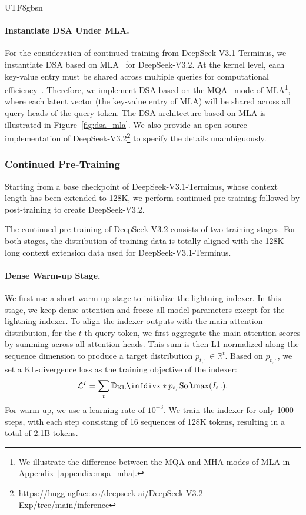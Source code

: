 \documentclass[11pt, a4paper, logo, copyright, nonumbering]{deepseek}
\def\newmodel{DeepSeek-V3.2}
\def\oldmodel{DeepSeek-V3.1-Terminus}
\def\method{DSA}
\newcommand{\Dkl}{\mathbb{D}_{\mathrm{KL}}\infdivx*}
\begin{document}
\begin{CJK*}{UTF8}{gbsn}
\paragraph{Instantiate \method{} Under MLA.}
For the consideration of continued training from \oldmodel{}, we instantiate DSA based on MLA~\citep{deepseekV2} for \newmodel{}.
At the kernel level, each key-value entry must be shared across multiple queries for computational efficiency~\citep{yuan-etal-2025-native}. 
Therefore, we implement DSA based on the MQA~\citep{MQA} mode of MLA\footnote{We illustrate the difference between the MQA and MHA modes of MLA in Appendix~\ref{appendix:mqa_mha}.}, where each latent vector (the key-value entry of MLA) will be shared across all query heads of the query token. 
The DSA architecture based on MLA is illustrated in Figure~\ref{fig:dsa_mla}.
We also provide an open-source implementation of \newmodel{}\footnote{\url{https://huggingface.co/deepseek-ai/DeepSeek-V3.2-Exp/tree/main/inference}} to specify the details unambiguously.

\subsubsection{Continued Pre-Training}

Starting from a base checkpoint of \oldmodel{}, whose context length has been extended to 128K, we perform continued pre-training followed by post-training to create \newmodel{}.

The continued pre-training of \newmodel{} consists of two training stages. 
For both stages, the distribution of training data is totally aligned with the 128K long context extension data used for \oldmodel{}. 

\paragraph{Dense Warm-up Stage.}
We first use a short warm-up stage to initialize the lightning indexer. 
In this stage, we keep dense attention and freeze all model parameters except for the lightning indexer. 
To align the indexer outputs with the main attention distribution, for the $t$-th query token, we first aggregate the main attention scores by summing across all attention heads. 
This sum is then L1-normalized along the sequence dimension to produce a target distribution $p_{t,:} \in \mathbb{R}^{t}$.
Based on $p_{t,:}$, we set a KL-divergence loss as the training objective of the indexer:
\begin{equation}
    \mathcal{L}^{I} = \sum_t \Dkl{p_{t,:}}{\text{Softmax}\qty({I}_{t,:})}.
\end{equation}
For warm-up, we use a learning rate of $10^{-3}$. 
We train the indexer for only 1000 steps, with each step consisting of 16 sequences of 128K tokens, resulting in a total of 2.1B tokens.


\end{CJK*}
\end{document}
